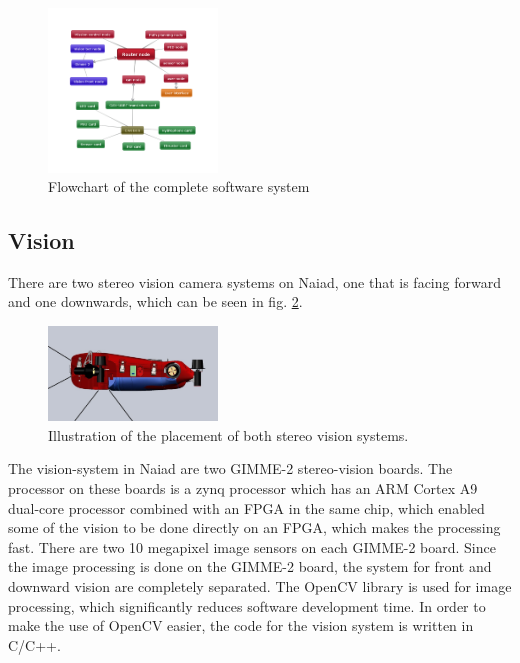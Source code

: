 \documentclass[twoside,12pt]{article}
\begin{document}
\begin{multicols*}{2}
\begin{figure}[H]
\begin{center}
\includegraphics[width=0.4\textwidth]{./images/flowchart.png}
\caption{Flowchart of the complete software system}
\label{softwareflow}
\end{center}
\end{figure}

\subsection{Vision}
There are two stereo vision camera systems on Naiad, one that is facing forward and one downwards, which can be seen in fig. \ref{cameras}. 
\begin{figure}[H]
\begin{center}
\includegraphics[width=0.4\textwidth]{./images/cameraplacement.jpg}
\caption{Illustration of the placement of both stereo vision systems.}
\label{cameras}
\end{center}
\end{figure}
The vision-system in Naiad are two GIMME-2 stereo-vision boards. The processor on these boards is a zynq processor which has an ARM Cortex A9 dual-core processor combined with an FPGA in the same chip, which enabled some of the vision to be done directly on an FPGA, which makes the processing fast. There are two 10 megapixel image sensors on each GIMME-2 board. Since the image processing is done on the GIMME-2 board, the system for front and downward vision are completely separated. The OpenCV library is used for image processing, which significantly reduces software development time. In order to make the use of OpenCV easier, the code for the vision system is written in C/C++.


\end{multicols*}
\end{document}
